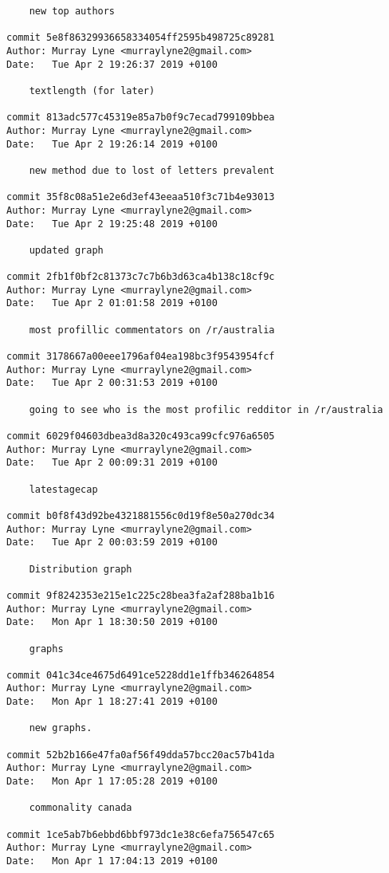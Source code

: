 \begin{lstlisting}
    new top authors

commit 5e8f86329936658334054ff2595b498725c89281
Author: Murray Lyne <murraylyne2@gmail.com>
Date:   Tue Apr 2 19:26:37 2019 +0100

    textlength (for later)

commit 813adc577c45319e85a7b0f9c7ecad799109bbea
Author: Murray Lyne <murraylyne2@gmail.com>
Date:   Tue Apr 2 19:26:14 2019 +0100

    new method due to lost of letters prevalent

commit 35f8c08a51e2e6d3ef43eeaa510f3c71b4e93013
Author: Murray Lyne <murraylyne2@gmail.com>
Date:   Tue Apr 2 19:25:48 2019 +0100

    updated graph

commit 2fb1f0bf2c81373c7c7b6b3d63ca4b138c18cf9c
Author: Murray Lyne <murraylyne2@gmail.com>
Date:   Tue Apr 2 01:01:58 2019 +0100

    most profillic commentators on /r/australia

commit 3178667a00eee1796af04ea198bc3f9543954fcf
Author: Murray Lyne <murraylyne2@gmail.com>
Date:   Tue Apr 2 00:31:53 2019 +0100

    going to see who is the most profilic redditor in /r/australia

commit 6029f04603dbea3d8a320c493ca99cfc976a6505
Author: Murray Lyne <murraylyne2@gmail.com>
Date:   Tue Apr 2 00:09:31 2019 +0100

    latestagecap

commit b0f8f43d92be4321881556c0d19f8e50a270dc34
Author: Murray Lyne <murraylyne2@gmail.com>
Date:   Tue Apr 2 00:03:59 2019 +0100

    Distribution graph

commit 9f8242353e215e1c225c28bea3fa2af288ba1b16
Author: Murray Lyne <murraylyne2@gmail.com>
Date:   Mon Apr 1 18:30:50 2019 +0100

    graphs

commit 041c34ce4675d6491ce5228dd1e1ffb346264854
Author: Murray Lyne <murraylyne2@gmail.com>
Date:   Mon Apr 1 18:27:41 2019 +0100

    new graphs.

commit 52b2b166e47fa0af56f49dda57bcc20ac57b41da
Author: Murray Lyne <murraylyne2@gmail.com>
Date:   Mon Apr 1 17:05:28 2019 +0100

    commonality canada

commit 1ce5ab7b6ebbd6bbf973dc1e38c6efa756547c65
Author: Murray Lyne <murraylyne2@gmail.com>
Date:   Mon Apr 1 17:04:13 2019 +0100


\end{lstlisting}
